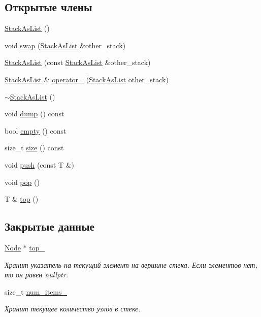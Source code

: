 \subsection*{Открытые члены}
\begin{DoxyCompactItemize}
\item 
\hyperlink{classstk_1_1_stack_as_list_afeaf9531232f88bbfaea6fa27bfbfadb}{Stack\+As\+List} ()
\item 
void \hyperlink{classstk_1_1_stack_as_list_ac60180f79b421783661b48e0aa3f5ed4}{swap} (\hyperlink{classstk_1_1_stack_as_list}{Stack\+As\+List} \&other\+\_\+stack)
\item 
\hyperlink{classstk_1_1_stack_as_list_a0506170dead8015e69e5216269f7d730}{Stack\+As\+List} (const \hyperlink{classstk_1_1_stack_as_list}{Stack\+As\+List} \&other\+\_\+stack)
\item 
\hyperlink{classstk_1_1_stack_as_list}{Stack\+As\+List} \& \hyperlink{classstk_1_1_stack_as_list_ae7aad592f9620668c52ea8a68257bdd2}{operator=} (\hyperlink{classstk_1_1_stack_as_list}{Stack\+As\+List} other\+\_\+stack)
\item 
\hyperlink{classstk_1_1_stack_as_list_aa1bf1ce65b108c2888d95195bfc9d473}{$\sim$\+Stack\+As\+List} ()
\item 
void \hyperlink{classstk_1_1_stack_as_list_aa1da18d566ab35554f4d3005d345ee5e}{dump} () const 
\item 
bool \hyperlink{classstk_1_1_stack_as_list_a56147e51e4a0c2fef70e6d40a7a0b63d}{empty} () const 
\item 
size\+\_\+t \hyperlink{classstk_1_1_stack_as_list_abd769ed3547312e16f9d8a1eff362cf0}{size} () const 
\item 
void \hyperlink{classstk_1_1_stack_as_list_abb8422958e3e7605f040550ab4400ccb}{push} (const T \&)
\item 
void \hyperlink{classstk_1_1_stack_as_list_a2f2b3319a9d76a9feb84b1855c84c55b}{pop} ()
\item 
T \& \hyperlink{classstk_1_1_stack_as_list_a12cfaa9a9a137c07258aec159779cd1e}{top} ()
\end{DoxyCompactItemize}
\subsection*{Закрытые данные}
\begin{DoxyCompactItemize}
\item 
\hyperlink{structstk_1_1_stack_as_list_1_1_node}{Node} $\ast$ \hyperlink{classstk_1_1_stack_as_list_afb5080650911a8b907dd5b383a153239}{top\+\_\+}
\begin{DoxyCompactList}\small\item\em Хранит указатель на текущий элемент на вершине стека. Если элементов нет, то он равен nullptr. \end{DoxyCompactList}\item 
size\+\_\+t \hyperlink{classstk_1_1_stack_as_list_a203bb8328f70a7e5b6eebbc29e71d011}{num\+\_\+items\+\_\+}
\begin{DoxyCompactList}\small\item\em Хранит текущее количество узлов в стеке. \end{DoxyCompactList}\end{DoxyCompactItemize}


